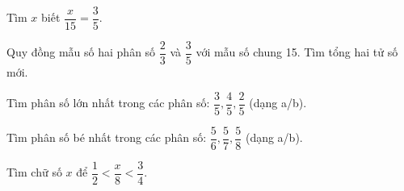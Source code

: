 \begin{ex} %
Tìm $x$ biết $\dfrac{x}{15} = \dfrac{3}{5}$.
\end{ex}

\begin{ex} %
Quy đồng mẫu số hai phân số $\dfrac{2}{3}$ và $\dfrac{3}{5}$ với mẫu số chung 15. Tìm tổng hai tử số mới.
\end{ex}

\begin{ex} %
Tìm phân số lớn nhất trong các phân số: $\dfrac{3}{5}, \dfrac{4}{5}, \dfrac{2}{5}$ (dạng a/b).
\end{ex}

\begin{ex} %
Tìm phân số bé nhất trong các phân số: $\dfrac{5}{6}, \dfrac{5}{7}, \dfrac{5}{8}$ (dạng a/b).
\end{ex}

\begin{ex} %
Tìm chữ số $x$ để $\dfrac{1}{2} < \dfrac{x}{8} < \dfrac{3}{4}$.
\end{ex}
